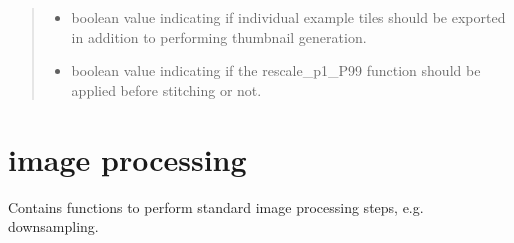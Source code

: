 \documentclass[a4paper,10pt,english,openany,oneside]{sphinxmanual}
\begin{document}
\begin{fulllineitems}
\begin{quote}
\begin{description}
\begin{itemize}
\item {} 
\sphinxAtStartPar
{} \textendash{} boolean value indicating if individual example tiles should be exported in addition to performing thumbnail generation.

\item {} 
\sphinxAtStartPar
{} \textendash{} boolean value indicating if the rescale\_p1\_P99 function should be applied before stitching or not.

\end{itemize}

\end{description}\end{quote}

\end{fulllineitems}

\label{\detokenize{pages/modules:module-vipertools.image_processing}}

\section{image processing}
\label{\detokenize{pages/modules:image-processing}}
\sphinxAtStartPar
Contains functions to perform standard image processing steps, e.g. downsampling.
\end{document}
